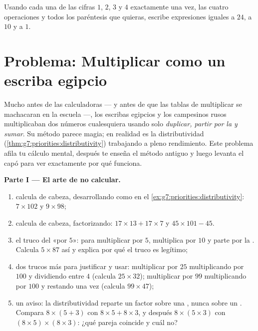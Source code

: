 \begin{exercise}[$\star\star\star$]\label{exo:g7:priorities:11}
Usando cada una de las cifras $1$, $2$, $3$ y $4$ exactamente una vez, las cuatro
operaciones y todos los paréntesis que quieras, escribe expresiones iguales a $24$, a
$10$ y a $1$.
\end{exercise}

\section{Problema: Multiplicar como un escriba egipcio}

\begin{problem}
\label{pb:g7:priorities:1}
Mucho antes de las calculadoras --- y antes de que las tablas de multiplicar se
machacaran en la escuela ---, los escribas egipcios y los campesinos rusos
multiplicaban dos números cualesquiera usando solo \emph{duplicar, partir por la  y
sumar}. Su método parece magia; en realidad es la
distributividad (\cref{thm:g7:priorities:distributivity}) trabajando
a pleno rendimiento. Este problema afila tu cálculo mental, después
te enseña el método antiguo y luego levanta el capó para ver exactamente
por qué funciona.

\medskip
\noindent\textbf{Parte I --- El arte de no calcular.}
\begin{enumerate}
  \item calcula de cabeza, desarrollando como en el
        \cref{ex:g7:priorities:distributivity}:
        $7 \times 102$ y $9 \times 98$;
  \item calcula de cabeza, factorizando:
        $17 \times 13 + 17 \times 7$ y
        $45 \times 101 - 45$.
  \item el truco del «por $5$»: para multiplicar por $5$, multiplica por
        $10$ y parte por la . Calcula $5 \times 87$ así y
        explica por qué el truco es legítimo;
  \item dos trucos más para justificar y usar: multiplicar por $25$
        multiplicando por $100$ y dividiendo entre $4$ (calcula
        $25 \times 32$); multiplicar por $99$ multiplicando por $100$
        y restando una vez (calcula $99 \times 47$);
  \item un aviso: la distributividad reparte un factor sobre una
        \emph{}, nunca sobre un . Compara
        $8 \times (5 + 3)$ con $8 \times 5 + 8 \times 3$, y
        después $8 \times (5 \times 3)$ con
        $(8 \times 5) \times (8 \times 3)$: ¿qué pareja coincide
        y cuál no?
\end{enumerate}


\end{problem}
